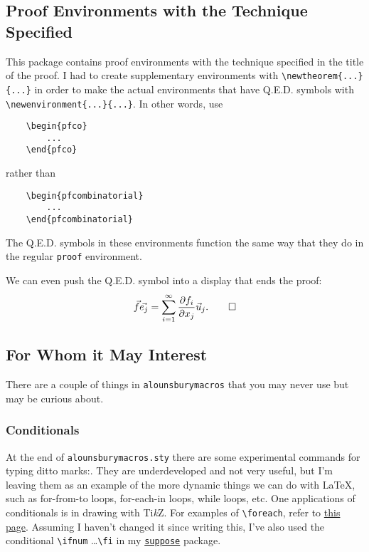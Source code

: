 \documentclass[12pt]{article}
\begin{document}
    \subsection{Proof Environments with the Technique Specified}
    This package contains proof environments with the technique specified in the title of the proof. I had to create supplementary environments with \verb$\newtheorem{...}{...}$ in order to make the actual environments that have Q.E.D. symbols with \verb$\newenvironment{...}{...}$. In other words, use 
    \begin{Verbatim}
    \begin{pfco}
        ...
    \end{pfco}
    \end{Verbatim}
    rather than 
    \begin{Verbatim}
    \begin{pfcombinatorial}
        ...
    \end{pfcombinatorial}
    \end{Verbatim}
    \begin{pfco}
        The Q.E.D. symbols in these environments function the same way that they do in the regular \texttt{proof} environment. 
    \end{pfco}
    \begin{pfi}
        We can even push the Q.E.D. symbol into a display that ends the proof: 
        \[
            \vec{f}\vec{e_j} = \sum\limits_{i=1}^{\infty} \frac{\partial f_i}{\partial x_j}\vec{u}_j. \qedhere
        \]
    \end{pfi}

    \subsection{For Whom it May Interest}
    There are a couple of things in \texttt{alounsburymacros} that you may never use but may be curious about. 
    \subsubsection{Conditionals}
    At the end of \texttt{alounsburymacros.sty} there are some experimental commands for typing ditto marks:\dit. They are underdeveloped and not very useful, but I'm leaving them as an example of the more dynamic things we can do with \LaTeX, such as for-from-to loops, for-each-in loops, while loops, etc. \p
    One applications of conditionals is in drawing with Ti\textit{k}Z. For examples of \verb$\foreach$, refer to \href{https://stuff.mit.edu/afs/athena/contrib/tex-contrib/beamer/pgf-1.01/doc/generic/pgf/version-for-tex4ht/en/pgfmanualse15.html}{this page}. \p
    Assuming I haven't changed it since writing this, I've also used the conditional \verb$\ifnum$ \dots \verb$\fi$ in my \href{https://ctan.org/pkg/suppose}{\texttt{suppose}} package. 
\end{document}
